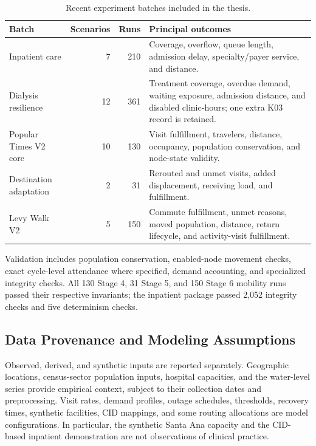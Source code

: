 \documentclass[pdflatex,sn-mathphys-num]{sn-jnl}%
\theoremstyle{thmstyleone}%
\theoremstyle{thmstyletwo}%
\theoremstyle{thmstylethree}%
\begin{document}
\begin{table}[ht]
\centering
\footnotesize
\caption{Recent experiment batches included in the thesis.}
\label{tbl:extended_batches}
\begin{tabularx}{\linewidth}{@{}lrrX@{}}
\toprule
\textbf{Batch} & \textbf{Scenarios} & \textbf{Runs} & \textbf{Principal outcomes} \\ \midrule
Inpatient care & 7 & 210 & Coverage, overflow, queue length, admission delay, specialty/payer service, and distance. \\ \midrule
Dialysis resilience & 12 & 361 & Treatment coverage, overdue demand, waiting exposure, admission distance, and disabled clinic-hours; one extra K03 record is retained. \\ \midrule
Popular Times V2 core & 10 & 130 & Visit fulfillment, travelers, distance, occupancy, population conservation, and node-state validity. \\ \midrule
Destination adaptation & 2 & 31 & Rerouted and unmet visits, added displacement, receiving load, and fulfillment. \\ \midrule
Levy Walk V2 & 5 & 150 & Commute fulfillment, unmet reasons, moved population, distance, return lifecycle, and activity-visit fulfillment. \\ \bottomrule
\end{tabularx}
\end{table}


Validation includes population conservation, enabled-node movement checks, exact cycle-level attendance where specified, demand accounting, and specialized integrity checks. All 130 Stage 4, 31 Stage 5, and 150 Stage 6 mobility runs passed their respective invariants; the inpatient package passed 2,052 integrity checks and five determinism checks.



\subsection{Data Provenance and Modeling Assumptions}
Observed, derived, and synthetic inputs are reported separately. Geographic locations, census-sector population inputs, hospital capacities, and the water-level series provide empirical context, subject to their collection dates and preprocessing. Visit rates, demand profiles, outage schedules, thresholds, recovery times, synthetic facilities, CID mappings, and some routing allocations are model configurations. In particular, the synthetic Santa Ana capacity and the CID-based inpatient demonstration are not observations of clinical practice.
\end{document}
